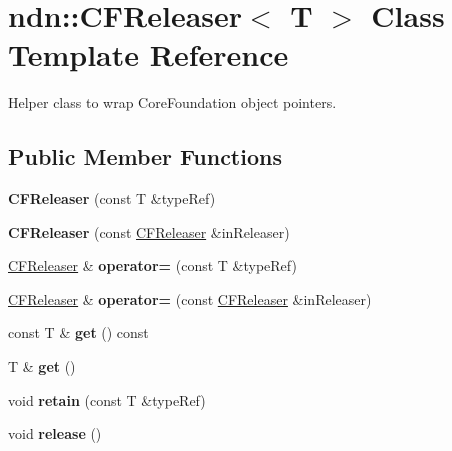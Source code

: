 \hypertarget{classndn_1_1CFReleaser}{}\section{ndn\+:\+:C\+F\+Releaser$<$ T $>$ Class Template Reference}
\label{classndn_1_1CFReleaser}


Helper class to wrap Core\+Foundation object pointers.  


\subsection*{Public Member Functions}
\begin{DoxyCompactItemize}
\item 
{\bfseries C\+F\+Releaser} (const T \&type\+Ref)\hypertarget{classndn_1_1CFReleaser_ad2d6e4fcc08b72db904959e444bf372a}{}\label{classndn_1_1CFReleaser_ad2d6e4fcc08b72db904959e444bf372a}

\item 
{\bfseries C\+F\+Releaser} (const \hyperlink{classndn_1_1CFReleaser}{C\+F\+Releaser} \&in\+Releaser)\hypertarget{classndn_1_1CFReleaser_ad0ef4be3f447630f740e5de7e2bd978e}{}\label{classndn_1_1CFReleaser_ad0ef4be3f447630f740e5de7e2bd978e}

\item 
\hyperlink{classndn_1_1CFReleaser}{C\+F\+Releaser} \& {\bfseries operator=} (const T \&type\+Ref)\hypertarget{classndn_1_1CFReleaser_ac967ba7d584316ef4fcae4ef8cc14970}{}\label{classndn_1_1CFReleaser_ac967ba7d584316ef4fcae4ef8cc14970}

\item 
\hyperlink{classndn_1_1CFReleaser}{C\+F\+Releaser} \& {\bfseries operator=} (const \hyperlink{classndn_1_1CFReleaser}{C\+F\+Releaser} \&in\+Releaser)\hypertarget{classndn_1_1CFReleaser_a7856f82ae4466465bfdaddf2a4f95123}{}\label{classndn_1_1CFReleaser_a7856f82ae4466465bfdaddf2a4f95123}

\item 
const T \& {\bfseries get} () const\hypertarget{classndn_1_1CFReleaser_a724d5b60390c0d96f1e13d8fb6105eae}{}\label{classndn_1_1CFReleaser_a724d5b60390c0d96f1e13d8fb6105eae}

\item 
T \& {\bfseries get} ()\hypertarget{classndn_1_1CFReleaser_aeed04020a95f52c0e6965b21bade3627}{}\label{classndn_1_1CFReleaser_aeed04020a95f52c0e6965b21bade3627}

\item 
void {\bfseries retain} (const T \&type\+Ref)\hypertarget{classndn_1_1CFReleaser_a334104693762c72a9b78dece398be44b}{}\label{classndn_1_1CFReleaser_a334104693762c72a9b78dece398be44b}

\item 
void {\bfseries release} ()\hypertarget{classndn_1_1CFReleaser_a9e7b972595ac0086c78ef5a84d5dd200}{}\label{classndn_1_1CFReleaser_a9e7b972595ac0086c78ef5a84d5dd200}

\end{DoxyCompactItemize}


